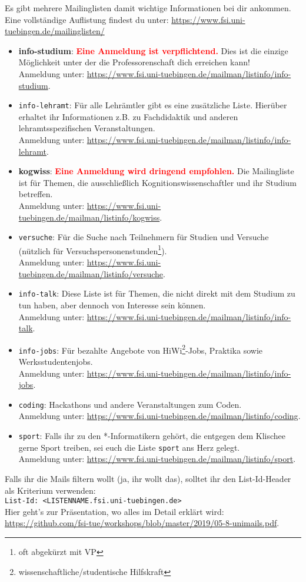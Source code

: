 Es gibt mehrere Mailinglisten damit wichtige Informationen bei dir ankommen.\\
Eine vollständige Auflistung findest du unter: \url{https://www.fsi.uni-tuebingen.de/mailinglisten/}
\begin{itemize}
\item \textbf{info-studium}: \textcolor{red}{\textbf{Eine Anmeldung ist verpflichtend.}} Dies ist die einzige Möglichkeit unter der die Professorenschaft dich erreichen kann! \\
Anmeldung unter: \url{https://www.fsi.uni-tuebingen.de/mailman/listinfo/info-studium}.
\iflehramt
\item \texttt{info-lehramt}: Für alle Lehrämtler gibt es eine zusätzliche Liste. Hierüber erhaltet ihr Informationen z.B. zu Fachdidaktik und anderen lehramtsspezifischen Veranstaltungen.\\
Anmeldung unter: \url{https://www.fsi.uni-tuebingen.de/mailman/listinfo/info-lehramt}.
\fi
\ifkogwiss 
\item \textbf{kogwiss}: \textcolor{red}{\textbf{Eine Anmeldung wird dringend empfohlen.}} Die Mailingliste ist für Themen, die ausschließlich Kognitionswissenschaftler und ihr Studium betreffen. \\
Anmeldung unter: \url{https://www.fsi.uni-tuebingen.de/mailman/listinfo/kogwiss}.

\item \texttt{versuche}: Für die Suche nach Teilnehmern für Studien und Versuche (nützlich für Versuchspersonenstunden\footnote{oft abgekürzt mit VP}).\\
Anmeldung unter: \url{https://www.fsi.uni-tuebingen.de/mailman/listinfo/versuche}. 
\fi
\item \texttt{info-talk}: Diese Liste ist für Themen, die nicht direkt mit dem Studium zu tun haben, aber dennoch von Interesse sein können.\\
Anmeldung unter: \url{https://www.fsi.uni-tuebingen.de/mailman/listinfo/info-talk}.
\item \texttt{info-jobs}: Für bezahlte Angebote von HiWi\footnote{wissenschaftliche/studentische Hilfskraft}-Jobs, Praktika sowie  Werksstudentenjobs.\\
Anmeldung unter: \url{https://www.fsi.uni-tuebingen.de/mailman/listinfo/info-jobs}.
\item \texttt{coding}: Hackathons und andere Veranstaltungen zum Coden.\\
Anmeldung unter: \url{https://www.fsi.uni-tuebingen.de/mailman/listinfo/coding}.
\item \texttt{sport}: Falls ihr zu den *-Informatikern gehört, die entgegen dem Klischee gerne Sport treiben, sei euch die Liste \texttt{sport} ans Herz gelegt.\\
Anmeldung unter: \url{https://www.fsi.uni-tuebingen.de/mailman/listinfo/sport}. 
\end{itemize}
Falls ihr die Mails filtern wollt (ja, ihr wollt das), solltet ihr den List-Id-Header als Kriterium verwenden: \\
\texttt{List-Id: <LISTENNAME.fsi.uni-tuebingen.de>} \\
Hier geht's zur Präsentation, wo alles im Detail erklärt wird: \url{https://github.com/fsi-tue/workshops/blob/master/2019/05-8-unimails.pdf}.
